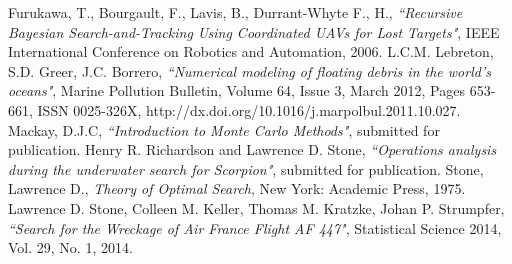 \documentclass[a4paper]{article}
\begin{document}
\pagebreak

\begin{thebibliography}{10}
 Furukawa, T., Bourgault, F., Lavis, B., Durrant-Whyte F., H., \emph{``Recursive Bayesian Search-and-Tracking Using Coordinated UAVs for Lost Targets"}, IEEE International Conference on Robotics and Automation, 2006. 
 L.C.M. Lebreton, S.D. Greer, J.C. Borrero, \emph{``Numerical modeling of floating debris in the world’s oceans"}, Marine Pollution Bulletin, Volume 64, Issue 3, March 2012, Pages 653-661, ISSN 0025-326X, http://dx.doi.org/10.1016/j.marpolbul.2011.10.027.
 Mackay, D.J.C, \emph{``Introduction to Monte Carlo Methods"}, submitted for publication.
 Henry R. Richardson and Lawrence D. Stone, \emph{``Operations analysis during the underwater search for Scorpion"}, submitted for publication. 
 Stone, Lawrence D., \textit{Theory of Optimal Search}, New York: Academic Press, 1975.
 Lawrence D. Stone, Colleen M. Keller, Thomas M. Kratzke, Johan P. Strumpfer, \emph{``Search for the Wreckage of Air France Flight AF 447"}, Statistical Science 2014, Vol. 29, No. 1, 2014.
\end{thebibliography}
\end{document}
